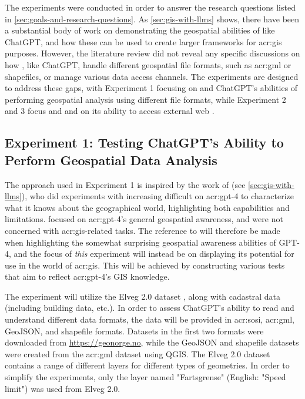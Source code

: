 The experiments were conducted in order to answer the research questions listed in \autoref{sec:goals-and-research-questions}. As \autoref{sec:gis-with-llms} shows, there have been a substantial body of work on demonstrating the geospatial abilities of  like ChatGPT, and how these can be used to create larger frameworks for \acrshort{acr:gis} purposes. However, the literature review did not reveal any specific discussions on how , like ChatGPT, handle different geospatial file formats, such as \acrshort{acr:gml} or shapefiles, or manage various data access channels. The experiments are designed to address these gaps, with Experiment 1 focusing on  and ChatGPT's abilities of performing geospatial analysis using different file formats, while Experiment 2 and 3 focus  and  and on its ability to access external web .

\subsection{Experiment 1: Testing ChatGPT's Ability to Perform Geospatial Data Analysis}

The approach used in Experiment 1 is inspired by the work of \cite{robertsGPT4GEOHowLanguage2023} (see \autoref{sec:gis-with-llms}), who did experiments with increasing difficult on \acrshort{acr:gpt}-4 to characterize what it knows about the geographical world, highlighting both capabilities and limitations. \citeauthor{robertsGPT4GEOHowLanguage2023} focused on \acrshort{acr:gpt}-4's general geospatial awareness, and were not concerned with \acrshort{acr:gis}-related tasks. The reference to \cite{robertsGPT4GEOHowLanguage2023} will therefore be made when highlighting the somewhat surprising geospatial awareness abilities of GPT-4, and the focus of \textit{this} experiment will instead be on displaying its potential for use in the world of \acrshort{acr:gis}. This will be achieved by constructing various tests that aim to reflect \acrshort{acr:gpt}-4's GIS knowledge.

The experiment will utilize the Elveg 2.0 dataset \citep{thenorwegianmappingauthorityElveg2019}, along with cadastral data (including building data, etc.). In order to assess ChatGPT's ability to read and understand different data formats, the data will be provided in \acrshort{acr:sosi}, \acrshort{acr:gml}, GeoJSON, and shapefile formats. Datasets in the first two formats were downloaded from \url{https://geonorge.no}, while the GeoJSON and shapefile datasets were created from the \acrshort{acr:gml} dataset using QGIS. The Elveg 2.0 dataset contains a range of different layers for different types of geometries. In order to simplify the experiments, only the layer named "Fartsgrense" (English: "Speed limit") was used from Elveg 2.0.

